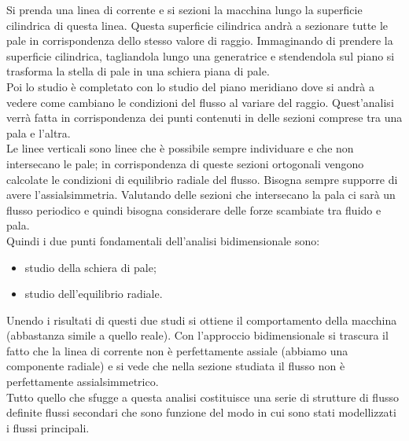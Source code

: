 Si prenda una linea di corrente e si sezioni la macchina lungo la superficie cilindrica di questa linea. Questa superficie cilindrica andrà a sezionare tutte le pale in corrispondenza dello stesso valore di raggio. Immaginando di prendere la superficie cilindrica, tagliandola lungo una generatrice e stendendola sul piano si trasforma la stella di pale in una schiera piana di pale.\\
Poi lo studio è completato con lo studio del piano meridiano dove si andrà a vedere come cambiano le condizioni del flusso al variare del raggio. Quest'analisi verrà fatta in corrispondenza dei punti contenuti in delle sezioni comprese tra una pala e l’altra.\\
Le linee verticali sono linee che è possibile sempre individuare e che non intersecano le pale; in corrispondenza di queste sezioni ortogonali vengono calcolate le condizioni di equilibrio radiale del flusso. Bisogna sempre supporre di avere l'assialsimmetria. Valutando delle sezioni che intersecano la pala ci sarà un flusso periodico e quindi bisogna considerare delle forze scambiate tra fluido e pala.\\
Quindi i due punti fondamentali dell'analisi bidimensionale sono:
\begin{itemize}
\item studio della schiera di pale;
\item studio dell'equilibrio radiale.
\end{itemize}
Unendo i risultati di questi due studi si ottiene il comportamento della macchina (abbastanza simile a quello reale).
Con l’approccio bidimensionale si trascura il fatto che la linea di corrente non è perfettamente assiale (abbiamo una componente radiale) e si vede che nella sezione studiata il flusso non è perfettamente assialsimmetrico.\\
Tutto quello che sfugge a questa analisi costituisce una serie di strutture di flusso definite flussi secondari che sono funzione del modo in cui sono stati modellizzati i flussi principali.
